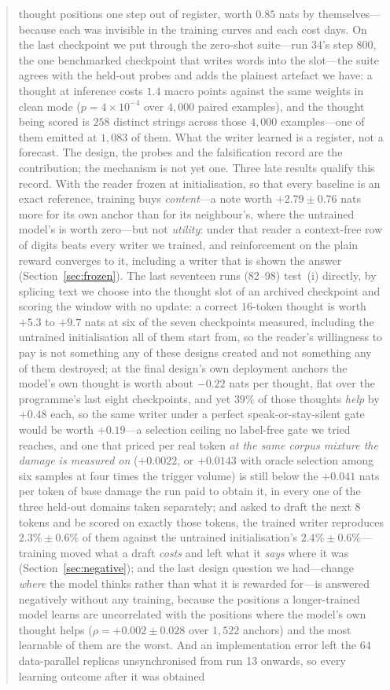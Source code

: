 \documentclass{article} %
\begin{document}
\begin{abstract}
thought positions one step out of register, worth $0.85$ nats by themselves---because each was invisible in the training curves and each cost days. On the last checkpoint we put through the zero-shot suite---run 34's step $800$, the one benchmarked checkpoint that writes words into the slot---the suite agrees with the held-out probes and adds the plainest artefact we have: a thought at inference costs $1.4$ macro points against the same weights in clean mode ($p = 4\times10^{-4}$ over $4{,}000$ paired examples), and the thought being scored is $258$ distinct strings across those $4{,}000$ examples---one of them emitted at $1{,}083$ of them. What the writer learned is a register, not a forecast. The design, the probes and the falsification record are the contribution; the mechanism is not yet one. Three late results qualify this record. With the reader frozen at initialisation, so that every baseline is an exact reference, training buys \emph{content}---a note worth $+2.79 \pm 0.76$ nats more for its own anchor than for its neighbour's, where the untrained model's is worth zero---but not \emph{utility}: under that reader a context-free row of digits beats every writer we trained, and reinforcement on the plain reward converges to it, including a writer that is shown the answer (Section~\ref{sec:frozen}). The last seventeen runs (82--98) test~(i) directly, by splicing text we choose into the thought slot of an archived checkpoint and scoring the window with no update: a correct $16$-token thought is worth $+5.3$ to $+9.7$ nats at six of the seven checkpoints measured, including the untrained initialisation all of them start from, so the reader's willingness to pay is not something any of these designs created and not something any of them destroyed; at the final design's own deployment anchors the model's own thought is worth about $-0.22$ nats per thought, flat over the programme's last eight checkpoints, and yet $39\%$ of those thoughts \emph{help} by $+0.48$ each, so the same writer under a perfect speak-or-stay-silent gate would be worth $+0.19$---a selection ceiling no label-free gate we tried reaches, and one that priced per real token \emph{at the same corpus mixture the damage is measured on} ($+0.0022$, or $+0.0143$ with oracle selection among six samples at four times the trigger volume) is still below the $+0.041$ nats per token of base damage the run paid to obtain it, in every one of the three held-out domains taken separately; and asked to draft the next $8$ tokens and be scored on exactly those tokens, the trained writer reproduces $2.3\% \pm 0.6\%$ of them against the untrained initialisation's $2.4\% \pm 0.6\%$---training moved what a draft \emph{costs} and left what it \emph{says} where it was (Section~\ref{sec:negative}); and the last design question we had---change \emph{where} the model thinks rather than what it is rewarded for---is answered negatively without any training, because the positions a longer-trained model learns are uncorrelated with the positions where the model's own thought helps ($\rho = +0.002 \pm 0.028$ over $1{,}522$ anchors) and the most learnable of them are the worst. And an implementation error left the $64$ data-parallel replicas unsynchronised from run 13 onwards, so every learning outcome after it was obtained 
\end{abstract}
\end{document}
